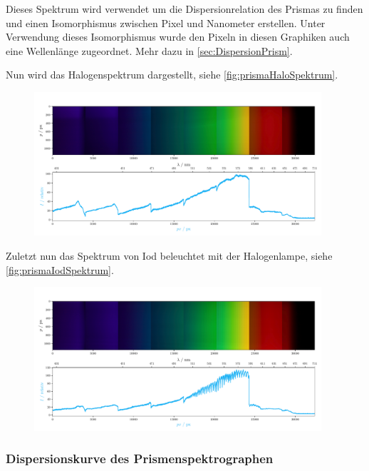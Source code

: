 \documentclass[12pt,english,ngerman]{scrartcl}
\begin{document}
Dieses Spektrum wird verwendet um die Dispersionrelation des Prismas zu finden
und einen Isomorphismus zwischen Pixel und Nanometer erstellen. Unter
Verwendung dieses Isomorphismus wurde den Pixeln in diesen Graphiken auch eine
Wellenlänge zugeordnet. Mehr dazu in \autoref{sec:DispersionPrism}.

Nun wird das Halogenspektrum dargestellt, siehe
\autoref{fig:prismaHaloSpektrum}. 
\begin{figure}[H]
	\begin{center}
		\includegraphics[width=0.95\textwidth]{figures/Halo_plot.pdf}
	\end{center}
	\caption{}\label{fig:prismaHaloSpektrum}
\end{figure}

Zuletzt nun das Spektrum von Iod beleuchtet mit der Halogenlampe, siehe
\autoref{fig:prismaIodSpektrum}.

\begin{figure}[H]
	\begin{center}
		\includegraphics[width=0.95\textwidth]{figures/I_plot.pdf}
	\end{center}
	\caption{}\label{fig:prismaIodSpektrum}
\end{figure}

\subsubsection{Dispersionskurve des Prismenspektrographen}\label{sec:DispersionPrism}
\end{document}
